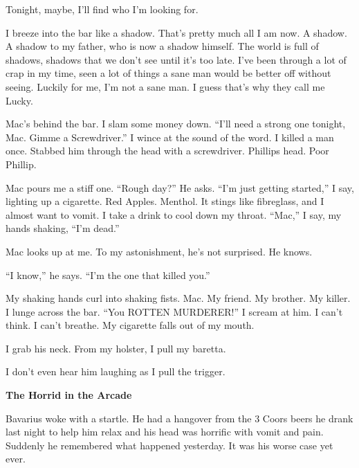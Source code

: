 Tonight, maybe, I'll find who I'm looking for.



I breeze into the bar like a shadow. That's pretty much all I am
now. A shadow. A shadow to my father, who is now a shadow himself.
The world is full of shadows, shadows that we don't see until it's
too late. I've been through a lot of crap in my time, seen a lot of
things a sane man would be better off without seeing. Luckily for
me, I'm not a sane man. I guess that's why they call me
Lucky.



Mac's behind the bar. I slam some money down. ``I'll need a strong
one tonight, Mac. Gimme a Screwdriver.'' I wince at the sound of the
word. I killed a man once. Stabbed him through the head with a
screwdriver. Phillips head. Poor Phillip.



Mac pours me a stiff one. ``Rough day?'' He asks. ``I'm just getting
started,'' I say, lighting up a cigarette. Red Apples. Menthol. It
stings like fibreglass, and I almost want to vomit. I take a drink
to cool down my throat. ``Mac,'' I say, my hands shaking, ``I'm
dead.''



Mac looks up at me. To my astonishment, he's not surprised. He
knows.



``I know,'' he says. ``I'm the one that killed you.''



My shaking hands curl into shaking fists. Mac. My friend. My
brother. My killer. I lunge across the bar. ``You ROTTEN MURDERER!''
I scream at him. I can't think. I can't breathe. My cigarette falls
out of my mouth.



I grab his neck. From my holster, I pull my baretta.



I don't even hear him laughing as I pull the trigger. 

 





{\bf The Horrid in the Arcade}

Bavarius woke with a startle. He had a hangover from the 3 Coors
beers he drank last night to help him relax and his head was
horrific with vomit and pain. Suddenly he remembered what happened
yesterday. It was his worse case yet ever.



